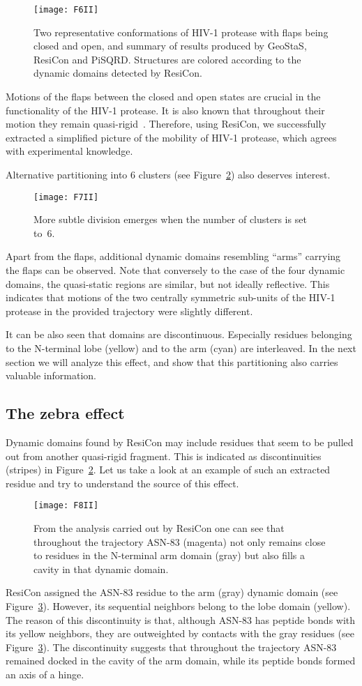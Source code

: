 \documentclass[a4paper,11pt,twoside]{book}%
\begin{document}
\begin{figure}
\centering
\texttt{[image: F6II]}
\caption{
Two representative conformations of HIV-1 protease with flaps being closed and open, and summary of results produced by GeoStaS, ResiCon and PiSQRD.
Structures are colored according to the dynamic domains detected by ResiCon.
}
\label{hiv}
\end{figure}
Motions of the flaps between the closed and open states are crucial in the functionality of the HIV-1 protease.
It is also known that throughout their motion they remain quasi-rigid~\cite{freedberg2002rapid}.
Therefore, using ResiCon, we successfully extracted a simplified picture of the mobility of HIV-1 protease, which agrees with experimental knowledge.

Alternative partitioning into 6 clusters (see Figure~\ref{6clusters}) also deserves interest.
\begin{figure}
\centering
\texttt{[image: F7II]}
\caption{
More subtle division emerges when the number of clusters is set to~6.
}
\label{6clusters}
\end{figure}
Apart from the flaps, additional dynamic domains resembling ``arms'' carrying the flaps can be observed.
Note that conversely to the case of the four dynamic domains, the quasi-static regions are similar, but not ideally reflective.
This indicates that motions of the two centrally symmetric sub-units of the HIV-1 protease in the provided trajectory were slightly different.

It can be also seen that domains are discontinuous.
Especially residues belonging to the N-terminal lobe (yellow) and to the arm (cyan) are interleaved.
In the next section we will analyze this effect, and show that this partitioning also carries valuable information.

\subsection*{The zebra effect}
Dynamic domains found by ResiCon may include residues that seem to be pulled out from another quasi-rigid fragment.
This is indicated as discontinuities (stripes) in Figure~\ref{6clusters}.
Let us take a look at an example of such an extracted residue and try to understand the source of this effect.
\begin{figure}
\centering
\texttt{[image: F8II]}
\caption{
From the analysis carried out by ResiCon one can see that throughout the trajectory ASN-83 (magenta) not only remains close to residues in the N-terminal arm domain (gray) but also fills a cavity in that dynamic domain.
}
\label{eradicated}
\end{figure}
ResiCon assigned the ASN-83 residue to the arm (gray) dynamic domain (see Figure~\ref{eradicated}).
However, its sequential neighbors belong to the lobe domain (yellow).
The reason of this discontinuity is that, although ASN-83 has peptide bonds with its yellow neighbors, they are outweighted by contacts with the gray residues (see Figure~\ref{eradicated}).
The discontinuity suggests that throughout the trajectory ASN-83 remained docked in the cavity of the arm domain, while its peptide bonds formed an axis of a hinge.
\end{document}
